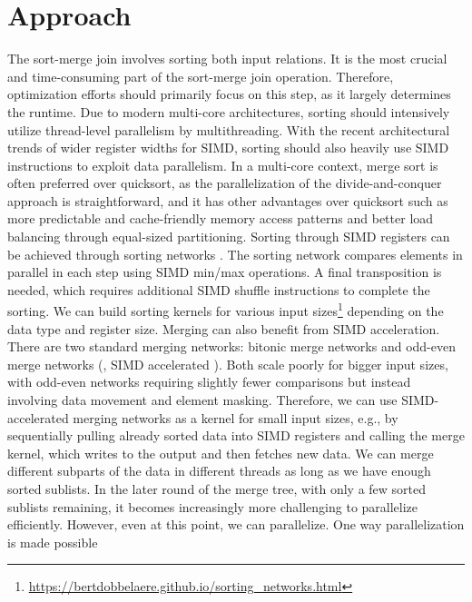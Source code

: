 \section{Approach}
\label{sec:approach}


The sort-merge join involves sorting both input relations. It is the most crucial and 
time-consuming part of the sort-merge join operation. Therefore, optimization efforts should
primarily focus on this step, as it largely determines the runtime. Due to modern multi-core 
architectures, sorting should intensively utilize thread-level parallelism by multithreading.
With the recent architectural trends of wider register widths for SIMD, sorting should also
heavily use SIMD instructions to exploit data parallelism. In a multi-core context, merge
sort is often preferred over quicksort, as the parallelization of the divide-and-conquer approach
is straightforward, and it has other advantages over quicksort such as more predictable and 
cache-friendly memory access patterns and better load balancing through equal-sized partitioning. 
Sorting through SIMD registers can be achieved through sorting networks \cite{10.1145/1468075.1468121}.
The sorting network compares elements in parallel in each step using SIMD min/max operations. 
A final transposition is needed, which requires additional SIMD shuffle instructions to complete
the sorting. We can build
sorting kernels for various input sizes\footnote{\url{https://bertdobbelaere.github.io/sorting_networks.html}} depending on the data type and register size. Merging can
also benefit from SIMD acceleration. There are two standard merging networks: bitonic merge networks
and odd-even merge networks (\cite{10.1145/1468075.1468121}, SIMD accelerated \cite{4336211}). Both scale poorly for bigger input sizes, with odd-even networks 
requiring slightly fewer comparisons but instead involving data movement and element masking.
Therefore, we can use SIMD-accelerated merging networks as a kernel for small input sizes, e.g., by
sequentially pulling already sorted data into SIMD registers and calling the merge kernel, which 
writes to the output and then fetches new data. We can merge different subparts of the data in
different threads as long as we have enough sorted sublists. In the later round of the merge tree,
with only a few sorted sublists remaining, it becomes increasingly more challenging to parallelize
efficiently. However, even at this point, we can parallelize. One way parallelization is made possible 
